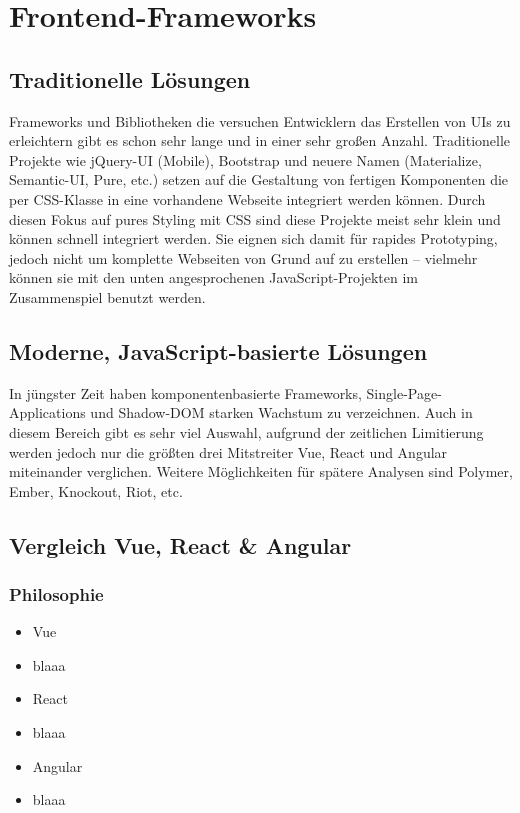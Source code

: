 \section{Frontend-Frameworks}
\subsection{Traditionelle Lösungen}
Frameworks und Bibliotheken die versuchen Entwicklern das Erstellen von UIs zu erleichtern gibt es schon sehr lange und in einer sehr großen Anzahl. Traditionelle Projekte wie jQuery-UI (Mobile), Bootstrap und neuere Namen (Materialize, Semantic-UI, Pure, etc.) setzen auf die Gestaltung von fertigen Komponenten die per CSS-Klasse in eine vorhandene Webseite integriert werden können. Durch diesen Fokus auf pures Styling mit CSS sind diese Projekte meist sehr klein und können schnell integriert werden. Sie eignen sich damit für rapides Prototyping, jedoch nicht um komplette Webseiten von Grund auf zu erstellen -- vielmehr können sie mit den unten angesprochenen JavaScript-Projekten im Zusammenspiel benutzt werden.

\subsection{Moderne, JavaScript-basierte Lösungen}
In jüngster Zeit haben komponentenbasierte Frameworks, Single-Page-Applications und Shadow-DOM starken Wachstum zu verzeichnen. 
Auch in diesem Bereich gibt es sehr viel Auswahl, aufgrund der zeitlichen Limitierung werden jedoch nur die größten drei Mitstreiter Vue, React und Angular  miteinander verglichen. Weitere Möglichkeiten für spätere Analysen sind Polymer, Ember, Knockout, Riot, etc.

\subsection{Vergleich Vue, React \& Angular}

\subsubsection{Philosophie}
\begin{itemize}
    \item{Vue}
    \item[] blaaa
    \item{React}
    \item[] blaaa
    \item{Angular}
    \item[] blaaa 
\end{itemize}

